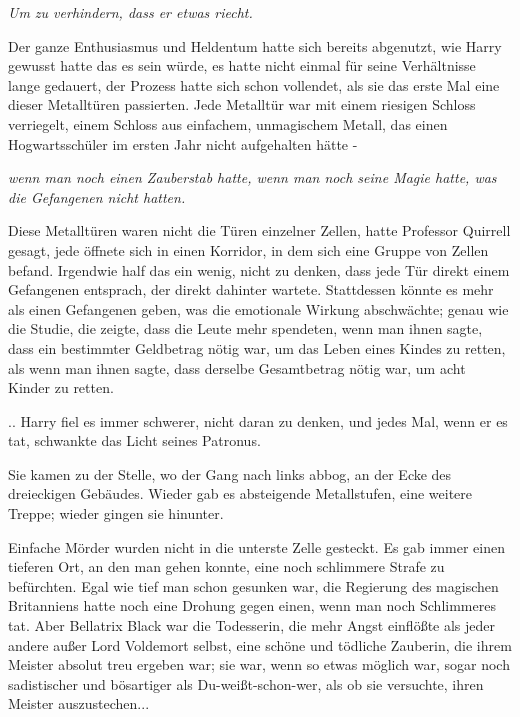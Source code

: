 \emph{Um zu verhindern, dass er etwas riecht.}

Der ganze Enthusiasmus und Heldentum hatte sich bereits abgenutzt, wie Harry
gewusst hatte das es sein würde, es hatte nicht einmal für seine Verhältnisse
lange gedauert, der Prozess hatte sich schon vollendet, als sie das erste Mal
eine dieser Metalltüren passierten. Jede Metalltür war mit einem riesigen
Schloss verriegelt, einem Schloss aus einfachem, unmagischem Metall, das einen
Hogwartsschüler im ersten Jahr nicht aufgehalten hätte -

\emph{wenn man noch einen Zauberstab hatte, wenn man noch seine Magie hatte, was die Gefangenen nicht hatten.}

Diese Metalltüren waren nicht die Türen einzelner Zellen, hatte Professor
Quirrell gesagt, jede öffnete sich in einen Korridor, in dem sich eine Gruppe
von Zellen befand. Irgendwie half das ein wenig, nicht zu denken, dass jede Tür
direkt einem Gefangenen entsprach, der direkt dahinter wartete. Stattdessen
könnte es mehr als einen Gefangenen geben, was die emotionale Wirkung
abschwächte; genau wie die Studie, die zeigte, dass die Leute mehr spendeten,
wenn man ihnen sagte, dass ein bestimmter Geldbetrag nötig war, um das Leben
eines Kindes zu retten, als wenn man ihnen sagte, dass derselbe Gesamtbetrag
nötig war, um acht Kinder zu retten.

.. Harry fiel es immer schwerer, nicht daran zu denken, und jedes Mal, wenn er
es tat, schwankte das Licht seines Patronus.

Sie kamen zu der Stelle, wo der Gang nach links abbog, an der Ecke des
dreieckigen Gebäudes. Wieder gab es absteigende Metallstufen, eine weitere
Treppe; wieder gingen sie hinunter.

Einfache Mörder wurden nicht in die unterste Zelle gesteckt. Es gab immer einen
tieferen Ort, an den man gehen konnte, eine noch schlimmere Strafe zu
befürchten. Egal wie tief man schon gesunken war, die Regierung des magischen
Britanniens hatte noch eine Drohung gegen einen, wenn man noch Schlimmeres tat.
Aber Bellatrix Black war die Todesserin, die mehr Angst einflößte als jeder
andere außer Lord Voldemort selbst, eine schöne und tödliche Zauberin, die ihrem
Meister absolut treu ergeben war; sie war, wenn so etwas möglich war, sogar noch
sadistischer und bösartiger als Du-weißt-schon-wer, als ob sie versuchte, ihren
Meister auszustechen...

